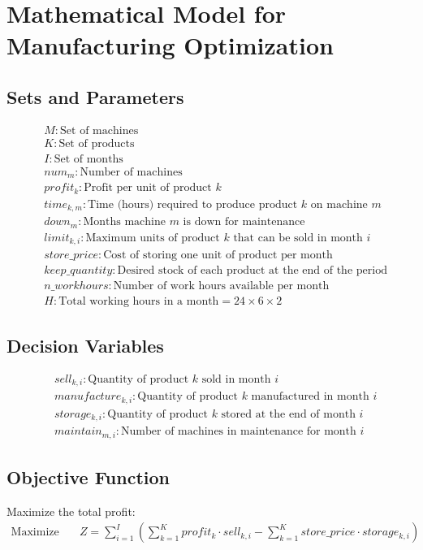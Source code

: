 \documentclass{article}
\begin{document}
\section*{Mathematical Model for Manufacturing Optimization}

\subsection*{Sets and Parameters}
\begin{align*}
& M: \text{Set of machines} \\
& K: \text{Set of products} \\
& I: \text{Set of months} \\
& num_{m}: \text{Number of machines} \\
& profit_{k}: \text{Profit per unit of product } k \\
& time_{k,m}: \text{Time (hours) required to produce product } k \text{ on machine } m \\
& down_{m}: \text{Months machine } m \text{ is down for maintenance} \\
& limit_{k,i}: \text{Maximum units of product } k \text{ that can be sold in month } i \\
& store\_price: \text{Cost of storing one unit of product per month} \\
& keep\_quantity: \text{Desired stock of each product at the end of the period} \\
& n\_workhours: \text{Number of work hours available per month} \\
& H: \text{Total working hours in a month} = 24 \times 6 \times 2
\end{align*}

\subsection*{Decision Variables}
\begin{align*}
& sell_{k,i}: \text{Quantity of product } k \text{ sold in month } i \\
& manufacture_{k,i}: \text{Quantity of product } k \text{ manufactured in month } i \\
& storage_{k,i}: \text{Quantity of product } k \text{ stored at the end of month } i \\
& maintain_{m,i}: \text{Number of machines in maintenance for month } i
\end{align*}

\subsection*{Objective Function}
Maximize the total profit:
\begin{align*}
\text{Maximize} \quad & Z = \sum_{i=1}^{I} \left( \sum_{k=1}^{K} profit_k \cdot sell_{k,i} - \sum_{k=1}^{K} store\_price \cdot storage_{k,i} \right)
\end{align*}
\end{document}
